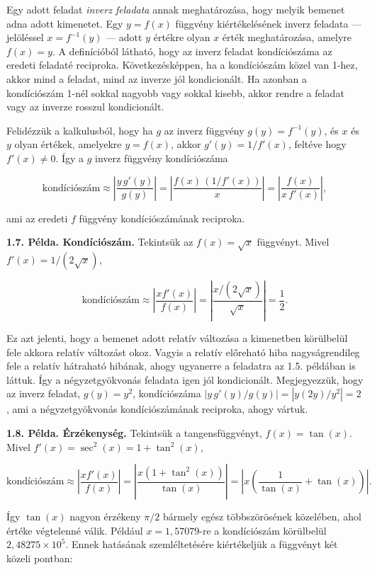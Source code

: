 \documentclass[
  magyar,
  11pt]{article}
\begin{document}
Egy adott feladat \emph{inverz feladata} annak meghatározása, hogy
melyik bemenet adna adott kimenetet. Egy \(y = f(x)\) függvény
kiértékelésének inverz feladata --- jelöléssel \(x = f^{-1}(y)\) ---
adott \(y\) értékre olyan \(x\) érték meghatározása, amelyre
\(f(x) = y\). A definícióból látható, hogy az inverz feladat
kondíciószáma az eredeti feladaté reciproka. Következésképpen, ha a
kondíciószám közel van 1-hez, akkor mind a feladat, mind az inverze jól
kondicionált. Ha azonban a kondíciószám 1-nél sokkal nagyobb vagy sokkal
kisebb, akkor rendre a feladat vagy az inverze rosszul kondicionált.

Felidézzük a kalkulusból, hogy ha \(g\) az inverz függvény
\(g(y) = f^{-1}(y)\), és \(x\) és \(y\) olyan értékek, amelyekre
\(y = f(x)\), akkor \(g'(y) = 1/f'(x)\), feltéve hogy \(f'(x) \neq 0\).
Így a \(g\) inverz függvény kondíciószáma

\[\text{kondíciószám} \approx \left| \frac{y\,g'(y)}{g(y)} \right| = \left| \frac{f(x)\,(1/f'(x))}{x} \right| = \left| \frac{f(x)}{x\,f'(x)} \right|,\]

ami az eredeti \(f\) függvény kondíciószámának reciproka.

\textbf{1.7. Példa. Kondíciószám.} Tekintsük az \(f(x) = \sqrt{x}\)
függvényt. Mivel \(f'(x) = 1/(2\sqrt{x})\),

\[\text{kondíciószám} \approx \left| \frac{xf'(x)}{f(x)} \right| = \left| \frac{x/(2\sqrt{x})}{\sqrt{x}} \right| = \frac{1}{2}.\]

Ez azt jelenti, hogy a bemenet adott relatív változása a kimenetben
körülbelül fele akkora relatív változást okoz. Vagyis a relatív
előreható hiba nagyságrendileg fele a relatív hátraható hibának, ahogy
ugyanerre a feladatra az 1.5. példában is láttuk. Így a négyzetgyökvonás
feladata igen jól kondicionált. Megjegyezzük, hogy az inverz feladat,
\(g(y) = y^2\), kondíciószáma \(|y\,g'(y)/g(y)| = |y(2y)/y^2| = 2\), ami
a négyzetgyökvonás kondíciószámának reciproka, ahogy vártuk.

\textbf{1.8. Példa. Érzékenység.} Tekintsük a tangensfüggvényt,
\(f(x) = \tan(x)\). Mivel \(f'(x) = \sec^2(x) = 1 + \tan^2(x)\),

\[\text{kondíciószám} \approx \left| \frac{xf'(x)}{f(x)} \right| = \left| \frac{x(1 + \tan^2(x))}{\tan(x)} \right| = \left| x \left( \frac{1}{\tan(x)} + \tan(x) \right) \right|.\]

Így \(\tan(x)\) nagyon érzékeny \(\pi/2\) bármely egész többszörösének
közelében, ahol értéke végtelenné válik. Például \(x = 1{,}57079\)-re a
kondíciószám körülbelül \(2{,}48275 \times 10^5\). Ennek hatásának
szemléltetésére kiértékeljük a függvényt két közeli pontban:
\end{document}
